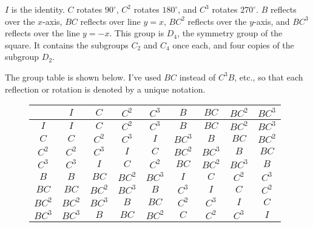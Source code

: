 \documentclass[../gatm.tex]{subfiles}
\begin{document}
\noindent $I$ is the identity. $C$ rotates $90^\circ$, $C^2$ rotates $180^\circ$, and $C^3$ rotates $270^\circ$. $B$ reflects over the $x$-axis, $BC$ reflects over line $y=x$, $BC^2$ reflects over the $y$-axis, and $BC^3$ reflects over the line $y=-x$. This group is $D_4$, the symmetry group of the square. It contains the subgroups $C_2$ and $C_4$ once each, and four copies of the subgroup $D_2$.

The group table is shown below. I've used $BC$ instead of $C^3B$, etc., so that each reflection or rotation is denoted by a unique notation.

\begin{figure}[h]
	\begin{center}
		\begin{minipage}[b]{\textwidth}
			\centering
			\begin{tabular}{c|cccccccc}
				\hline
				& $I$ & $C$ & $C^2$ & $C^3$ & $B$ & $BC$ & $BC^2$ & $BC^3$ \\ \hline
				\rowcolor{light-gray}
				$I$ & $I$ & $C$ & $C^2$ & $C^3$ & $B$ & $BC$ & $BC^2$ & $BC^3$ \\
				$C$ & $C$ & $C^2$ & $C^3$ & $I$ & $BC^3$ & $B$ & $BC$ & $BC^2$ \\
				\rowcolor{light-gray}
				$C^2$ & $C^2$ & $C^3$ & $I$ & $C$ & $BC^2$ & $BC^3$ & $B$ & $BC$ \\
				$C^3$ & $C^3$ & $I$ & $C$ & $C^2$ & $BC$ & $BC^2$ & $BC^3$ & $B$ \\
				\rowcolor{light-gray}
				$B$ & $B$ & $BC$ & $BC^2$ & $BC^3$ & $I$ & $C$ & $C^2$ & $C^3$ \\
				$BC$ & $BC$ & $BC^2$ & $BC^3$ & $B$ & $C^3$ & $I$ & $C$ & $C^2$ \\
				\rowcolor{light-gray}
				$BC^2$ & $BC^2$ & $BC^3$ & $B$ & $BC$ & $C^2$ & $C^3$ & $I$ & $C$ \\
				$BC^3$ & $BC^3$ & $B$ & $BC$ & $BC^2$ & $C$ & $C^2$ & $C^3$ & $I$ \\ \hline
			\end{tabular}
			\vspace*{0.5\baselineskip}
		\end{minipage}
	\end{center}
\end{figure}

\vspace*{-2\baselineskip}
\end{document}
